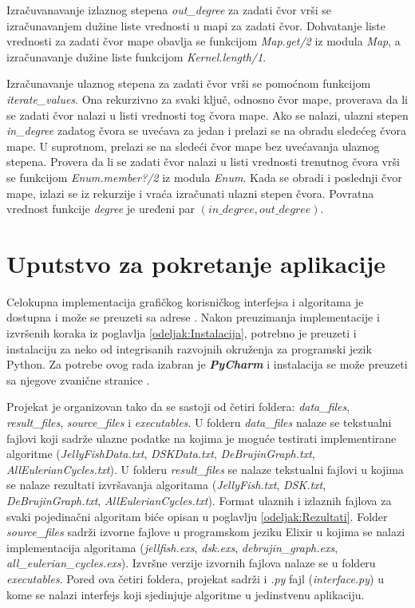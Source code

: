 \documentclass[12pt,oneside]{memoir}
\begin{document}
Izračuvanavanje izlaznog stepena \textit{out\_degree} za zadati čvor vrši se izračunavanjem dužine liste vrednosti u mapi za zadati čvor. Dohvatanje liste vrednosti za zadati čvor mape obavlja se funkcijom \textit{Map.get/2} iz modula \textit{Map}, a izračunavanje dužine liste funkcijom \textit{Kernel.length/1}.

Izračunavanje ulaznog stepena za zadati čvor vrši se pomoćnom funkcijom \textit{iterate\_values}. Ona rekurzivno za svaki ključ, odnosno čvor mape, proverava da li se zadati čvor nalazi u listi vrednosti tog čvora mape. Ako se nalazi, ulazni stepen \textit{in\_degree} zadatog čvora se uvećava za jedan i prelazi se na obradu sledećeg čvora mape. U suprotnom, prelazi se na sledeći čvor mape bez uvećavanja ulaznog stepena. Provera da li se zadati čvor nalazi u listi vrednosti trenutnog čvora vrši se funkcijom \textit{Enum.member?/2} iz modula \textit{Enum}. Kada se obradi i poslednji čvor mape, izlazi se iz rekurzije i vraća izračunati ulazni stepen čvora. Povratna vrednost funkcije \textit{degree} je uređeni par $(\textit{in\_degree}, \textit{out\_degree})$.



\section{Uputstvo za pokretanje aplikacije}

Celokupna implementacija grafičkog korisničkog interfejsa i algoritama je dostupna i može se preuzeti sa adrese \cite{GIT}. Nakon preuzimanja implementacije i izvršenih koraka iz poglavlja \ref{odeljak:Instalacija}, potrebno je preuzeti i instalaciju za neko od integrisanih razvojnih okruženja za programski jezik Python. Za potrebe ovog rada izabran je \textit{\textbf{PyCharm}} i instalacija se može preuzeti sa njegove zvanične stranice \cite{PyCharm}. 

Projekat je organizovan tako da se sastoji od četiri foldera: \textit{data\_files}, \textit{result\_files}, \textit{source\_files} i \textit{executables}. U folderu \textit{data\_files} nalaze se tekstualni fajlovi koji sadrže ulazne podatke na kojima je moguće testirati implementirane algoritme (\textit{JellyFishData.txt}, \textit{DSKData.txt}, \textit{DeBrujinGraph.txt}, \textit{AllEulerianCycles.txt}). U folderu \textit{result\_files} se nalaze tekstualni fajlovi u kojima se nalaze rezultati izvršavanja algoritama (\textit{JellyFish.txt}, \textit{DSK.txt}, \textit{DeBrujinGraph.txt}, \textit{AllEulerianCycles.txt}). Format ulaznih i izlaznih fajlova za svaki pojedinačni algoritam biće opisan u poglavlju \ref{odeljak:Rezultati}. Folder \textit{source\_files} sadrži izvorne fajlove u programskom jeziku Elixir u kojima se nalazi implementacija algoritama (\textit{jellfish.exs}, \textit{dsk.exs}, \textit{debrujin\_graph.exs}, \textit{all\_eulerian\_cycles.exs}). Izvršne verzije izvornih fajlova nalaze se u folderu \textit{executables}. Pored ova četiri foldera, projekat sadrži i \textit{.py} fajl (\textit{interface.py}) u kome se nalazi interfejs koji sjedinjuje algoritme u jedinstvenu aplikaciju.
\end{document}
